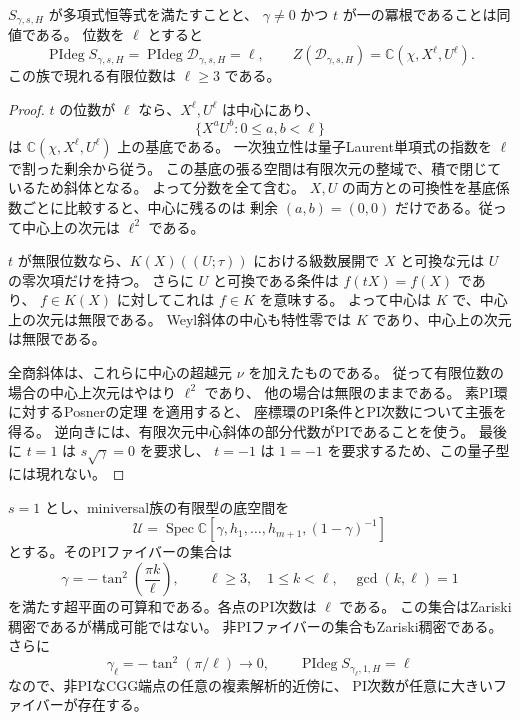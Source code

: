 \begin{proposition}[PI条件と次数]
\label{prop:endpoint-PI-v38}
$S_{\gamma,s,H}$ が多項式恒等式を満たすことと、
$\gamma\ne0$ かつ $t$ が一の冪根であることは同値である。
位数を $\ell$ とすると
\[
 \operatorname{PIdeg}S_{\gamma,s,H}
 =\operatorname{PIdeg}\mathscr D_{\gamma,s,H}=\ell,
 \qquad
 Z(\mathscr D_{\gamma,s,H})=\mathbb C(\chi,X^\ell,U^\ell).
\]
この族で現れる有限位数は $\ell\ge3$ である。
\end{proposition}

\begin{proof}
$t$ の位数が $\ell$ なら、$X^\ell,U^\ell$ は中心にあり、
\[
 \{X^aU^b:0\le a,b<\ell\}
\]
は $\mathbb C(\chi,X^\ell,U^\ell)$ 上の基底である。
一次独立性は量子Laurent単項式の指数を $\ell$ で割った剰余から従う。
この基底の張る空間は有限次元の整域で、積で閉じているため斜体となる。
よって分数を全て含む。
$X,U$ の両方との可換性を基底係数ごとに比較すると、中心に残るのは
剰余 $(a,b)=(0,0)$ だけである。従って中心上の次元は $\ell^2$ である。

$t$ が無限位数なら、$K(X)((U;\tau))$ における級数展開で
$X$ と可換な元は $U$ の零次項だけを持つ。
さらに $U$ と可換である条件は $f(tX)=f(X)$ であり、
$f\in K(X)$ に対してこれは $f\in K$ を意味する。
よって中心は $K$ で、中心上の次元は無限である。
Weyl斜体の中心も特性零では $K$ であり、中心上の次元は無限である。

全商斜体は、これらに中心の超越元 $\nu$ を加えたものである。
従って有限位数の場合の中心上次元はやはり $\ell^2$ であり、
他の場合は無限のままである。
素PI環に対するPosnerの定理
\cite[Theorem~4.1]{Bresar2010Bir38}を適用すると、
座標環のPI条件とPI次数について主張を得る。
逆向きには、有限次元中心斜体の部分代数がPIであることを使う。
最後に $t=1$ は $s\sqrt\gamma=0$ を要求し、
$t=-1$ は $1=-1$ を要求するため、この量子型には現れない。
\end{proof}

\begin{corollary}[PI次数が非有界に増える代数的変形族]
\label{cor:endpoint-PI-accumulation-v38}
$s=1$ とし、miniversal族の有限型の底空間を
\[
 \mathcal U=\operatorname{Spec}
 \mathbb C[\gamma,h_1,\ldots,h_{m+1},(1-\gamma)^{-1}]
\]
とする。そのPIファイバーの集合は
\[
 \gamma=-\tan^2\left(\frac{\pi k}{\ell}\right),
 \qquad \ell\ge3,\quad 1\le k<\ell,\quad \gcd(k,\ell)=1
\]
を満たす超平面の可算和である。各点のPI次数は $\ell$ である。
この集合はZariski稠密であるが構成可能ではない。
非PIファイバーの集合もZariski稠密である。
さらに
\[
 \gamma_\ell=-\tan^2(\pi/\ell)\longrightarrow0,
 \qquad \operatorname{PIdeg}S_{\gamma_\ell,1,H}=\ell
\]
なので、非PIなCGG端点の任意の複素解析的近傍に、
PI次数が任意に大きいファイバーが存在する。
\end{corollary}

